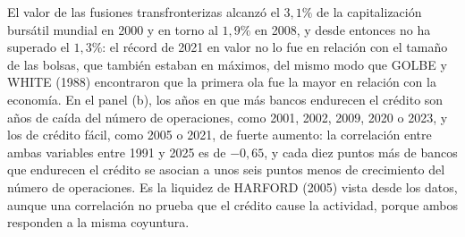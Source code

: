 \documentclass[10pt,a4paper]{article}
\begin{document}
El valor de las fusiones transfronterizas alcanzó el $3{,}1\%$ de la capitalización bursátil mundial en 2000 y en torno al $1{,}9\%$ en 2008, y desde entonces no ha superado el $1{,}3\%$: el récord de 2021 en valor no lo fue en relación con el tamaño de las bolsas, que también estaban en máximos, del mismo modo que GOLBE y WHITE (1988) encontraron que la primera ola fue la mayor en relación con la economía. En el panel (b), los años en que más bancos endurecen el crédito son años de caída del número de operaciones, como 2001, 2002, 2009, 2020 o 2023, y los de crédito fácil, como 2005 o 2021, de fuerte aumento: la correlación entre ambas variables entre 1991 y 2025 es de $-0{,}65$, y cada diez puntos más de bancos que endurecen el crédito se asocian a unos seis puntos menos de crecimiento del número de operaciones. Es la liquidez de HARFORD (2005) vista desde los datos, aunque una correlación no prueba que el crédito cause la actividad, porque ambos responden a la misma coyuntura.
\end{document}
